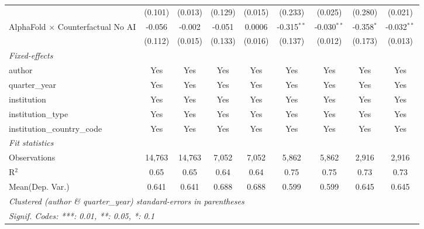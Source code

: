 \begin{tabular}{lcccccccc}
                                            & (0.101) & (0.013) & (0.129) & (0.015) & (0.233)       & (0.025)       & (0.280)      & (0.021)\\   
   AlphaFold $\times$ Counterfactual No AI  & -0.056  & -0.002  & -0.051  & 0.0006  & -0.315$^{**}$ & -0.030$^{**}$ & -0.358$^{*}$ & -0.032$^{**}$\\   
                                            & (0.112) & (0.015) & (0.133) & (0.016) & (0.137)       & (0.012)       & (0.173)      & (0.013)\\   
   \midrule
   \emph{Fixed-effects}\\
   author                                   & Yes     & Yes     & Yes     & Yes     & Yes           & Yes           & Yes          & Yes\\  
   quarter\_year                            & Yes     & Yes     & Yes     & Yes     & Yes           & Yes           & Yes          & Yes\\  
   institution                              & Yes     & Yes     & Yes     & Yes     & Yes           & Yes           & Yes          & Yes\\  
   institution\_type                        & Yes     & Yes     & Yes     & Yes     & Yes           & Yes           & Yes          & Yes\\  
   institution\_country\_code               & Yes     & Yes     & Yes     & Yes     & Yes           & Yes           & Yes          & Yes\\  
   \midrule
   \emph{Fit statistics}\\
   Observations                             & 14,763  & 14,763  & 7,052   & 7,052   & 5,862         & 5,862         & 2,916        & 2,916\\  
   R$^2$                                    & 0.65    & 0.65    & 0.64    & 0.64    & 0.75          & 0.75          & 0.73         & 0.73\\  
Mean(Dep. Var.) & 0.641 & 0.641 & 0.688 & 0.688 & 0.599 & 0.599 & 0.645 & 0.645 \\
   \midrule \midrule
   \multicolumn{9}{l}{\emph{Clustered (author \& quarter\_year) standard-errors in parentheses}}\\
   \multicolumn{9}{l}{\emph{Signif. Codes: ***: 0.01, **: 0.05, *: 0.1}}\\
\end{tabular}
\par\endgroup
